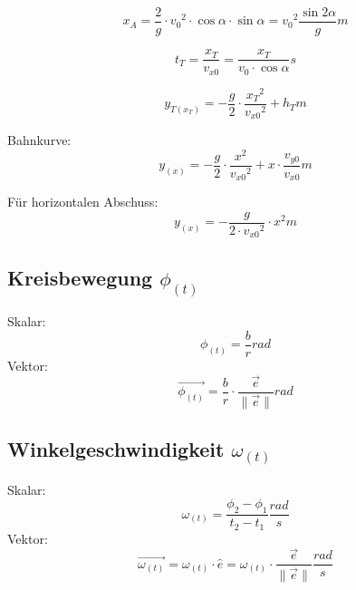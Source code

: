 \begin{equation}
x_A = \frac{2}{g} \cdot {v_0}^2 \cdot \cos{\alpha} \cdot \sin{\alpha} = {v_0}^2 \frac{\sin{2\alpha}}{g} \unit{m}
\end{equation}

\begin{equation}
t_T = \frac{x_T}{v_{x0}} = \frac{x_T}{v_0 \cdot \cos{\alpha}} \unit{s}
\end{equation}

\begin{equation}
y_{T(x_T)} = -\frac{g}{2} \cdot \frac{{x_T}^2}{{v_{x0}}^2} + h_T \unit{m}
\end{equation}

Bahnkurve:
\begin{equation}
	y_{(x)} = -\frac{g}{2} \cdot \frac{x^2}{{v_{x0}}^2} + x \cdot \frac{v_{y0}}{v_{x0}} \unit{m}
\end{equation}

F\"ur horizontalen Abschuss:
\begin{equation}
	y_{(x)} = -\frac{g}{2 \cdot {v_{x0}}^2} \cdot x^2 \unit{m}
\end{equation}


\subsection{Kreisbewegung $\phi_{(t)}$}
Skalar:
\begin{equation}
	\phi_{(t)} = \frac{b}{r} \unit{rad}
\end{equation}
\noindent Vektor:
\begin{equation}
	\vec{\phi_{(t)}} = \frac{b}{r} \cdot \frac{\vec{e}}{\|\vec{e}\|} \unit{rad}
\end{equation}


\subsection{Winkelgeschwindigkeit $\omega_{(t)}$}
Skalar:
\begin{equation}
	\omega_{(t)} = \frac{\phi_2 - \phi_1}{t_2 - t_1} \unit{\frac{rad}{s}}
\end{equation}
\noindent Vektor:
\begin{equation}
	\vec{\omega_{(t)}} = \omega_{(t)} \cdot \hat{e} = \omega_{(t)} \cdot \frac{\vec{e}}{\|\vec{e}\|} \unit{\frac{rad}{s}}
\end{equation}


